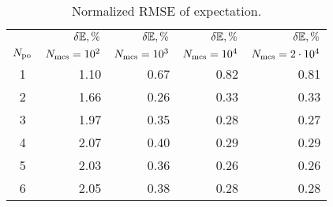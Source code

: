 \begin{table}
  \centering
  \caption{Normalized RMSE of expectation.}
  \vspace{-10pt}
  \begin{tabular}{crrrr}
    \toprule
    {} & $\delta\mathbb{E}, \%$ & $\delta\mathbb{E}, \%$ & $\delta\mathbb{E}, \%$ & $\delta\mathbb{E}, \%$ \\
    ${N_\text{po}}$ & $N_\text{mcs} = 10^2$ & $N_\text{mcs} = 10^3$ & $N_\text{mcs} = 10^4$ & $N_\text{mcs} = 2 \cdot 10^4$ \\
    \midrule
    1 & 1.10 & 0.67 & 0.82 & 0.81 \\
    2 & 1.66 & 0.26 & 0.33 & 0.33 \\
    3 & 1.97 & 0.35 & 0.28 & 0.27 \\
    4 & 2.07 & 0.40 & 0.29 & 0.29 \\
    5 & 2.03 & 0.36 & 0.26 & 0.26 \\
    6 & 2.05 & 0.38 & 0.28 & 0.28 \\
    \bottomrule
  \end{tabular}
  \vspace{-10pt}
\end{table}
